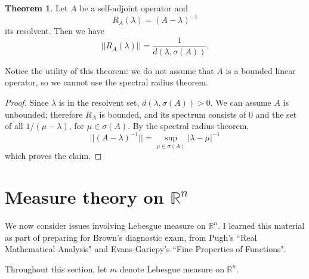 \documentclass[12pt]{report}
\newcommand{\RR}{\mathbb{R}}
\theoremstyle{definition}
\newtheorem{theorem}{Theorem}[chapter]
\begin{document}
\begin{theorem}
\label{norm of the resolvent}
Let $A$ be a self-adjoint operator and
$$R_A(\lambda) = (A - \lambda)^{-1}$$
its resolvent. Then we have
$$||R_A(\lambda)|| = \frac{1}{d(\lambda, \sigma(A))}.$$
\end{theorem}
Notice the utility of this theorem: we do not assume that $A$ is a bounded linear operator, so we cannot use the spectral radius theorem.
\begin{proof}
Since $\lambda$ is in the resolvent set, $d(\lambda, \sigma(A)) > 0$. We can assume $A$ is unbounded; therefore $R_A$ is bounded, and its spectrum consists of $0$ and the set of all $1/(\mu - \lambda)$, for $\mu \in \sigma(A)$. By the spectral radius theorem,
$$||(A - \lambda)^{-1}|| = \sup_{\mu \in \sigma(A)} |\lambda - \mu|^{-1}$$
which proves the claim.
\end{proof}

\chapter{Measure theory on $\RR^n$}
We now consider issues involving Lebesgue measure on $\RR^n$. I learned this material as part of preparing for Brown's diagnostic exam, from Pugh's ``Real Mathematical Analysis" and Evans-Gariepy's ``Fine Properties of Functions".

Throughout this section, let $m$ denote Lebesgue measure on $\RR^n$.
\end{document}
